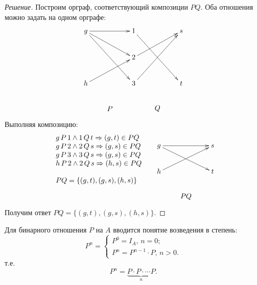 \begin{proof}[Решение]
    Построим орграф, соответствующий композиции $PQ$. Оба отношения можно задать на одном орграфе:
    \[
    \xymatrix{
        g  \ar@{->}[rr] \ar@{->}[drr] \ar@{->}[ddrr]
            &*{}
                &1 \ar@{->}[ddrr]
                    &*{}
                        &s 
                            \\
        *{}
            &*{}
                &2 \ar@{->}[urr]
                    &*{}
                        &*{}
                            \\
        h \ar@{->}[urr]
            &*{}
                &3 \ar@{->}[uurr]
                    &*{}
                        &t
                            \\
        *{}
            &*{P}
                &*{}
                    &*{Q}
                        &*{}
    }
    \]

    Выполняя композицию:
    \[
        \begin{array}{cc}
        {
            \raisebox{-0.5\height}{
            \(
                \begin{array}{l}
                    g\,P\,1\land 1\,Q\,t\Rightarrow (g,t)\in PQ\\
                    g\,P\,2\land 2\,Q\,s\Rightarrow (g,s)\in PQ\\
                    g\,P\,3\land 3\,Q\,s\Rightarrow (g,s)\in PQ\\
                    h\,P\,2\land 2\,Q\,s\Rightarrow (h,s)\in PQ\\
                    \\
                    PQ=\{(g,t),(g,s),(h,s)\}
                \end{array}
            \)
            }
        }
        &
        {\xymatrix{
                g  \ar@{->}[rr] \ar@{->}[drr]
                    &*{}
                        &s
                            \\
                h \ar@{->}[urr]
                    &*{}
                        &t 
                            \\
                *{}
                    &*{PQ}
                        &*{}
        }}
        \end{array}
    \]
    
    Получим ответ $PQ=\{(g,t),(g,s),(h,s)\}$.
\end{proof}

Для бинарного отношения $P$ на $A$ вводится понятие возведения в степень:
\[
    P^n=
    \begin{cases}
        P^{0}=I_A,\,n=0;\\
        P^{n}=P^{n-1}\cdot P,\,n>0.
    \end{cases}
\]
т.е.
\[
    P^n=\underbrace{P\cdot P\cdot\cdots P}_n.
\]



